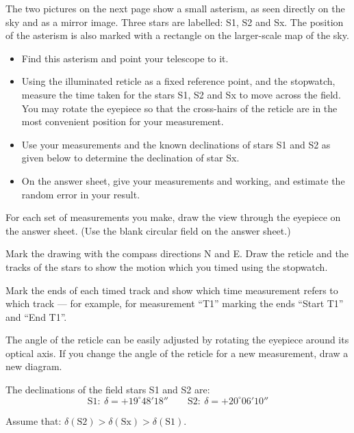 The two pictures on the next page show a small asterism, as seen directly on
the sky and as a mirror image. Three stars are labelled: S1, S2 and Sx. The
position of the asterism is also marked with a rectangle on the larger-scale
map of the sky.


\begin{itemize}
\item Find this asterism and point your telescope to it.
\item Using the illuminated reticle as a fixed reference point, and the
  stopwatch, measure the time taken for the stars S1, S2 and Sx to move across
  the field. You may rotate the eyepiece so that the cross-hairs of the
  reticle are in the most convenient position for your measurement.
\item Use your measurements and the known declinations of stars S1 and S2 as
  given below to determine the declination of star Sx.
\item On the answer sheet, give your measurements and working, and estimate
  the random error in your result.
\end{itemize}

For each set of measurements you make, draw the view through the eyepiece on
the answer sheet. (Use the blank circular field on the answer sheet.)

Mark the drawing with the compass directions N and E. Draw the reticle and the
tracks of the stars to show the motion which you timed using the stopwatch.

Mark the ends of each timed track and show which time measurement refers to
which track --- for example, for measurement ``T1'' marking the ends
``Start T1'' and ``End T1''.

The angle of the reticle can be easily adjusted by rotating the eyepiece
around its optical axis. If you change the angle of the reticle for a new
measurement, draw a new diagram.

The declinations of the field stars S1 and S2 are:
\[ \mathrm{S1}: \ \delta = +19^\circ 48' 18'' \qquad
   \mathrm{S2}: \ \delta = +20^\circ 06' 10'' \]

Assume that: $\delta(\mathrm{S2}) > \delta(\mathrm{Sx}) >
\delta(\mathrm{S1})$.
